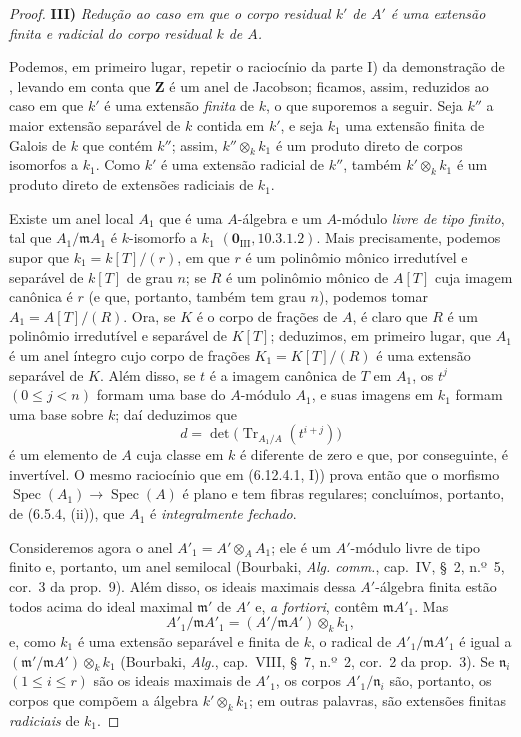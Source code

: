 \begin{proof}
\medskip
\noindent\textbf{III)} \emph{Redução
ao caso em que o corpo residual
$k'$ de $A'$ é uma extensão
finita e radicial do corpo
residual $k$ de $A$.}

Podemos, em primeiro lugar,
repetir o raciocínio da parte I)
da demonstração de
, levando em
conta que $\mathbf Z$ é um
anel de
Jacobson; ficamos, assim,
reduzidos ao caso em que $k'$
é uma extensão \emph{finita}
de $k$, o que suporemos a
seguir. Seja $k''$ a maior
extensão separável de $k$
contida em $k'$, e seja $k_1$
uma extensão finita de Galois
de $k$ que contém $k''$; assim,
$k''\otimes_k k_1$ é um produto
direto de corpos isomorfos a
$k_1$. Como $k'$ é uma extensão
radicial de $k''$, também
$k'\otimes_k k_1$ é um produto
direto de extensões radiciais
de $k_1$.

Existe um anel local $A_1$
que é uma $A$-álgebra e um
$A$-módulo \emph{livre de tipo
finito}, tal que
$A_1/\mathfrak m A_1$ é
$k$-isomorfo a $k_1$
$(\mathbf 0_{\mathrm{III}},10.3.1.2)$.
Mais precisamente, podemos
supor que $k_1=k[T]/(r)$,
em que $r$ é um polinômio
mônico irredutível e separável
de $k[T]$ de grau $n$; se
$R$ é um polinômio mônico de
$A[T]$ cuja imagem canônica
é $r$ (e que, portanto, também
tem grau $n$), podemos tomar
$A_1=A[T]/(R)$. Ora, se $K$
é o corpo de frações de $A$,
é claro que $R$ é um polinômio
irredutível e separável de
$K[T]$; deduzimos, em primeiro
lugar, que $A_1$ é um anel
íntegro cujo corpo de frações
$K_1=K[T]/(R)$ é uma extensão
separável de $K$. Além disso,
se $t$ é a imagem canônica de
$T$ em $A_1$, os $t^j$
$(0\leq j<n)$ formam uma base
do $A$-módulo $A_1$, e suas
imagens em $k_1$ formam uma
base sobre $k$; daí deduzimos
que
\[
d=\det\bigl(\operatorname{Tr}_{A_1/A}
(t^{i+j})\bigr)
\]
é um elemento de $A$ cuja
classe em $k$ é diferente de
zero e que, por conseguinte,
é invertível. O mesmo
raciocínio que em (6.12.4.1, I))
prova então que o morfismo
$\operatorname{Spec}(A_1)
\to\operatorname{Spec}(A)$
é plano e tem fibras regulares;
concluímos, portanto, de
(6.5.4, (ii)), que $A_1$ é
\emph{integralmente fechado}.

Consideremos agora o anel
$A'_1=A'\otimes_A A_1$; ele
é um $A'$-módulo livre de tipo
finito e, portanto, um anel
semilocal (Bourbaki,
\emph{Alg. comm.}, cap.~IV,
\S~2, n.º~5, cor.~3 da prop.~9).
Além disso, os ideais maximais
dessa $A'$-álgebra finita estão
todos acima do ideal maximal
$\mathfrak m'$ de $A'$ e,
\emph{a fortiori}, contêm
$\mathfrak m A'_1$. Mas
\[
A'_1/\mathfrak m A'_1
=(A'/\mathfrak m A')\otimes_k k_1,
\]
e, como $k_1$ é uma extensão
separável e finita de $k$,
o radical de
$A'_1/\mathfrak m A'_1$ é igual
a $(\mathfrak m'/\mathfrak m A')
\otimes_k k_1$ (Bourbaki,
\emph{Alg.}, cap.~VIII,
\S~7, n.º~2, cor.~2 da prop.~3).
Se $\mathfrak n_i$
$(1\leq i\leq r)$ são os ideais
maximais de $A'_1$, os corpos
$A'_1/\mathfrak n_i$ são,
portanto, os corpos que
compõem a álgebra
$k'\otimes_k k_1$; em outras
palavras, são extensões
finitas \emph{radiciais} de
$k_1$.


\end{proof}
